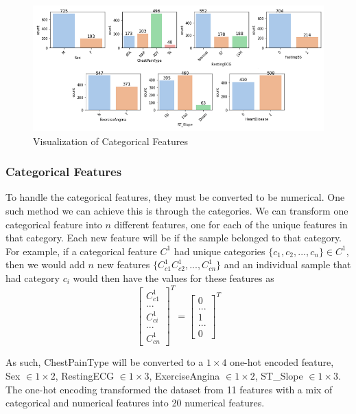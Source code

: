 \documentclass[12pt,conference]{IEEEtran}
\begin{document}
\begin{figure}[t]
\centering\includegraphics[width=\textwidth]{categories}
\caption{\label{fig:categories}Visualization of Categorical Features}
\end{figure}

\subsubsection{Categorical Features} 
To handle the categorical features, they must be converted to be numerical. One such method we can achieve this is through  the categories. We can transform one categorical feature into $n$ different features, one for each of the unique features in that category. Each new feature will be  if the sample belonged to that category. For example, if a categorical feature $C^1$ had unique categories $\{c_1, c_2, ..., c_n\} \in C^1$, then we would add $n$ new features $\{C^1_{c1} C^1_{c2}, ..., C^1_{cn}\}$ and an individual sample that had category $c_i$ would then have the values for these features as
$$\begin{bmatrix}C^1_{c1}\\...\\C^1_{ci}\\...\\C^1_{cn}\end{bmatrix}^T = \begin{bmatrix}0\\...\\1\\...\\0\end{bmatrix}^T $$

As such, ChestPainType will be converted to a $1\times 4$ one-hot encoded feature, Sex $\in 1\times 2$, RestingECG $\in 1\times 3$, ExerciseAngina $\in 1\times 2$, ST\_Slope $\in 1\times 3$. The one-hot encoding transformed the dataset from 11 features with a mix of categorical and numerical features into 20 numerical features.
\end{document}
